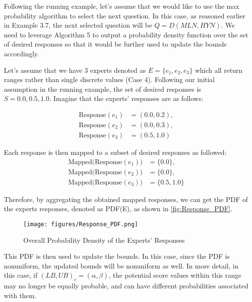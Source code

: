 \begin{example}
    Following the running example, let's assume that we would like to use the max probability algorithm to select the next question. In this case, as reasoned earlier in Example 3.7, the next selected question will be $Q = D(MLN, HYN)$. 
    We need to leverage Algorithm 5 to output a probability density function over the set of desired responses so that it would be further used to update the bounds accordingly. 
    
    Let's assume that we have 3 experts denoted as $E = \{e_1, e_2, e_3\}$ which all return ranges rather than single discrete values (Case 4). Following our initial assumption in the running example, the set of desired responses is $S = {0.0, 0.5, 1.0}$. Imagine that the experts' responses are as follows:

\[
\begin{aligned}
    \text{Response}(e_1) &= (0.0, 0.2), \\
    \text{Response}(e_2) &= (0.0, 0.3), \\
    \text{Response}(e_3) &= (0.5, 1.0)
\end{aligned}
\]

Each response is then mapped to a subset of desired responses as followed:
\[
\begin{aligned}
    \text{Mapped(Response}(e_1)) &= \{0.0\}, \\
    \text{Mapped(Response}(e_2)) &= \{0.0\}, \\
    \text{Mapped(Response}(e_3)) &= \{0.5, 1.0\}
\end{aligned}
\]

Therefore, by aggregating the obtained mapped responses, we can get the PDF of the experts responses, denoted as PDF(E), as shown in \autoref{fig:Response_PDF}.

\begin{figure}[ht]
    \centering
    \texttt{[image: figures/Response\_PDF.png]}
    \caption{Overall Probability Density of the Experts' Responses}
    \label{fig:Response_PDF}
\end{figure}

This PDF is then used to update the bounds. In this case, since the PDF is nonuniform, the updated bounds will be nonuniform as well. In more detail, in this case, if $(LB, UB)_c = (\alpha, \beta)$, the potential score values within this range may no longer be equally probable, and can have different probabilities associated with them. 

\end{example}